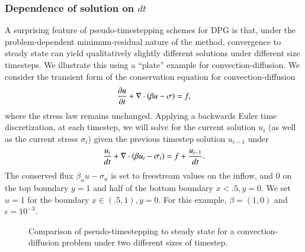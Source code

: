 \subsubsection{Dependence of solution on $dt$}

A surprising feature of pseudo-timestepping schemes for DPG is that, under the problem-dependent minimum-residual nature of the method, convergence to steady state can yield qualitatively slightly different solutions under different size timesteps.  We illustrate this using a ``plate'' example for convection-diffusion.  We consider the transient form of the conservation equation for convection-diffusion
\[
\pd{u}{t} + \div \LRp{\beta u - \sigma} = f, 
\]
where the stress law remains unchanged.  Applying a backwards Euler time discretization, at each timestep, we will solve for the current solution $u_i$ (as well as the current stress $\sigma_i$) given the previous timestep solution $u_{i-1}$ under
\[
\frac{u_i}{dt} + \div \LRp{\beta u_i - \sigma_i} = f + \frac{u_{i-1}}{dt}.
\]
The conserved flux $\beta_n u - \sigma_n$ is set to freestream values on the inflow, and 0 on the top boundary $y = 1$ and half of the bottom boundary $x < .5, y = 0$.  We set $u = 1$ for the boundary $x \in (.5,1), y = 0$. For this example, $\beta = (1,0)$ and $\epsilon = 10^{-3}$.  
\begin{figure}
\centering
{}
\caption{Comparison of pseudo-timestepping to steady state for a convection-diffusion problem under two different sizes of timestep.}
\label{fig:dtComparison}
\end{figure}
